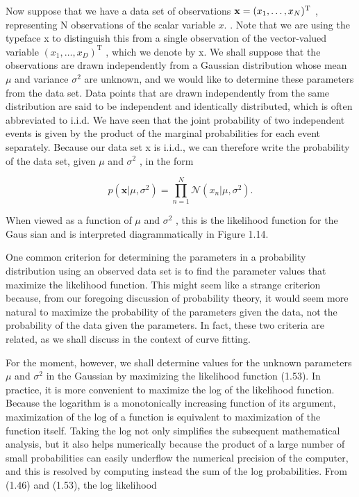 \documentclass[
  10
]{article}
\begin{document}
Now suppose that we have a data set of observations
\({ \bf x } = ( x _ { 1 } , \ldots , x _ { N } ) ^ { \mathrm { T } }\) ,
representing N observations of the scalar variable \(x .\) . Note that
we are using the typeface x to distinguish this from a single
observation of the vector-valued variable
\(( x _ { 1 } , \ldots , x _ { D } ) ^ { \mathrm { T } }\) , which we
denote by x. We shall suppose that the observations are drawn
independently from a Gaussian distribution whose mean \(\mu\) and
variance \(\sigma ^ { 2 }\) are unknown, and we would like to determine
these parameters from the data set. Data points that are drawn
independently from the same distribution are said to be independent and
identically distributed, which is often abbreviated to i.i.d. We have
seen that the joint probability of two independent events is given by
the product of the marginal probabilities for each event separately.
Because our data set x is i.i.d., we can therefore write the probability
of the data set, given \(\mu\) and \(\sigma ^ { 2 }\) , in the form

\[
p (\mathbf {x} | \mu , \sigma^ {2}) = \prod_ {n = 1} ^ {N} \mathcal {N} \left(x _ {n} | \mu , \sigma^ {2}\right).\tag{1.53}
\]

When viewed as a function of \(\mu\) and \(\sigma ^ { 2 }\) , this is
the likelihood function for the Gaus sian and is interpreted
diagrammatically in Figure 1.14.

One common criterion for determining the parameters in a probability
distribution using an observed data set is to find the parameter values
that maximize the likelihood function. This might seem like a strange
criterion because, from our foregoing discussion of probability theory,
it would seem more natural to maximize the probability of the parameters
given the data, not the probability of the data given the parameters. In
fact, these two criteria are related, as we shall discuss in the context
of curve fitting.

For the moment, however, we shall determine values for the unknown
parameters \(\mu\) and \(\sigma ^ { 2 }\) in the Gaussian by maximizing
the likelihood function (1.53). In practice, it is more convenient to
maximize the log of the likelihood function. Because the logarithm is a
monotonically increasing function of its argument, maximization of the
log of a function is equivalent to maximization of the function itself.
Taking the log not only simplifies the subsequent mathematical analysis,
but it also helps numerically because the product of a large number of
small probabilities can easily underflow the numerical precision of the
computer, and this is resolved by computing instead the sum of the log
probabilities. From (1.46) and (1.53), the log likelihood
\end{document}
